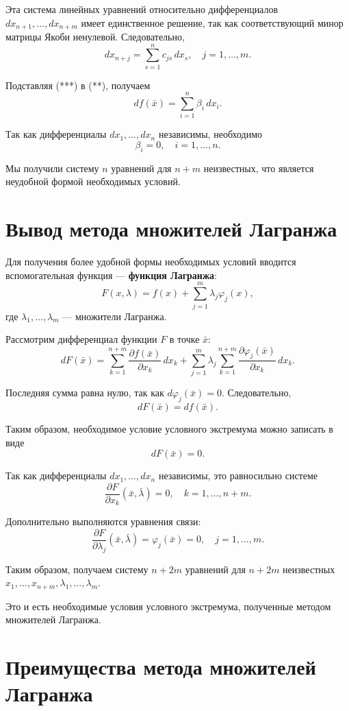 \documentclass{article}
\begin{document}
Эта система линейных уравнений относительно дифференциалов
$dx_{n+1},\dots,dx_{n+m}$ имеет единственное решение,
так как соответствующий минор матрицы Якоби ненулевой.
Следовательно,
\begin{equation}
dx_{n+j}=\sum_{s=1}^{n} c_{js}\,dx_s,
\quad j=1,\dots,m.
\tag{***}
\end{equation}

Подставляя (***) в (**), получаем
\[
df(\bar{x})=\sum_{i=1}^{n}\beta_i\,dx_i.
\]

Так как дифференциалы $dx_1,\dots,dx_n$ независимы, необходимо
\[
\beta_i=0,\quad i=1,\dots,n.
\]

Мы получили систему $n$ уравнений для $n+m$ неизвестных,
что является неудобной формой необходимых условий.

\section{Вывод метода множителей Лагранжа}

Для получения более удобной формы необходимых условий
вводится вспомогательная функция --- \textbf{функция Лагранжа}:
\[
F(x,\lambda)
=
f(x)+\sum_{j=1}^{m}\lambda_j\varphi_j(x),
\]
где $\lambda_1,\dots,\lambda_m$ --- множители Лагранжа.

Рассмотрим дифференциал функции $F$ в точке $\bar{x}$:
\[
dF(\bar{x})
=
\sum_{k=1}^{n+m}
\frac{\partial f(\bar{x})}{\partial x_k}\,dx_k
+
\sum_{j=1}^{m}\lambda_j
\sum_{k=1}^{n+m}
\frac{\partial \varphi_j(\bar{x})}{\partial x_k}\,dx_k.
\]

Последняя сумма равна нулю, так как
$d\varphi_j(\bar{x})=0$.
Следовательно,
\[
dF(\bar{x})=df(\bar{x}).
\]

Таким образом, необходимое условие условного экстремума
можно записать в виде
\[
dF(\bar{x})=0.
\]

Так как дифференциалы $dx_1,\dots,dx_n$ независимы,
это равносильно системе
\[
\frac{\partial F}{\partial x_k}(\bar{x},\bar{\lambda})=0,
\quad k=1,\dots,n+m.
\]

Дополнительно выполняются уравнения связи:
\[
\frac{\partial F}{\partial \lambda_j}(\bar{x},\bar{\lambda})
=
\varphi_j(\bar{x})=0,
\quad j=1,\dots,m.
\]

Таким образом, получаем систему $n+2m$ уравнений
для $n+2m$ неизвестных $x_1,\dots,x_{n+m},\lambda_1,\dots,\lambda_m$.

Это и есть необходимые условия условного экстремума,
полученные методом множителей Лагранжа.


\section{Преимущества метода множителей Лагранжа}
\end{document}
